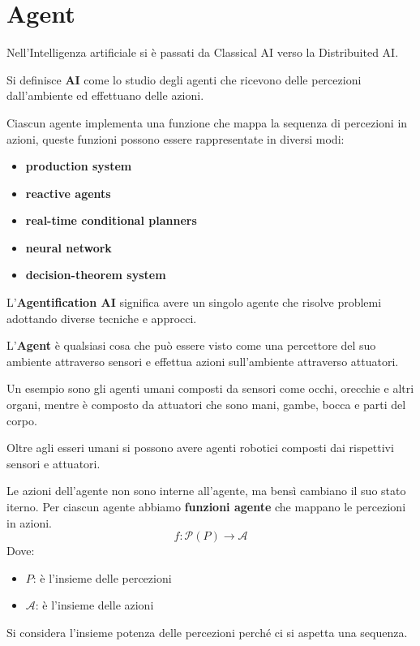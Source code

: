 \chapter{Agent}
Nell'Intelligenza artificiale si è passati da Classical AI verso la Distribuited
AI.

\begin{definizione}[\textbf{AI}]
    Si definisce \textbf{AI} come lo studio degli agenti che ricevono delle
    percezioni dall'ambiente ed effettuano delle azioni.
\end{definizione}
Ciascun agente implementa una funzione che mappa la sequenza di percezioni in azioni,
queste funzioni possono essere rappresentate in diversi modi:
\begin{itemize}
    \item \textbf{production system}
    \item \textbf{reactive agents}
    \item \textbf{real-time conditional planners}
    \item \textbf{neural network}
    \item \textbf{decision-theorem system}
\end{itemize}

\begin{definizione}
    L'\textbf{Agentification AI} significa avere un singolo agente che risolve
    problemi adottando diverse tecniche e approcci.
\end{definizione}

\begin{definizione}
    L'\textbf{Agent} è qualsiasi cosa che può essere visto come una percettore del
    suo ambiente attraverso sensori e effettua azioni sull'ambiente attraverso attuatori.
\end{definizione}

\begin{esempio}
    Un esempio sono gli agenti umani composti da sensori come occhi, orecchie e altri
    organi, mentre è composto da attuatori che sono mani, gambe, bocca e parti del corpo.

    Oltre agli esseri umani si possono avere agenti robotici composti dai rispettivi
    sensori e attuatori.
\end{esempio}


Le azioni dell'agente non sono interne all'agente, ma bensì cambiano
il suo stato iterno. Per ciascun agente abbiamo \textbf{funzioni agente} che mappano
le percezioni in azioni.
$$f:\mathcal{P}(P)\rightarrow \mathcal{A}$$
Dove:
\begin{itemize}
    \item $P$: è l'insieme delle percezioni
    \item $\mathcal{A}$: è l'insieme delle azioni
\end{itemize}
Si considera l'insieme potenza delle percezioni perché ci si aspetta una sequenza.

